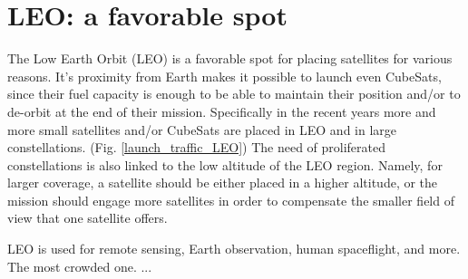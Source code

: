 

\bigskip
\section{LEO: a favorable spot}
\bigskip

The Low Earth Orbit (LEO) is a favorable spot for placing satellites for various reasons. It's proximity from Earth makes it possible to launch even CubeSats, since their fuel capacity is enough to be able to maintain their position and/or to de-orbit at the end of their mission. Specifically in the recent years more and more small satellites and/or CubeSats are placed in LEO and in large constellations. (Fig. \ref{launch_traffic_LEO}) The need of proliferated constellations is also linked to the low altitude of the LEO region. Namely, for larger coverage, a satellite should be either placed in a higher altitude, or the mission should engage more satellites in order to compensate the smaller field of view that one satellite offers.

LEO is used for remote sensing, Earth observation, human spaceflight, and more. The most crowded one. 
...





